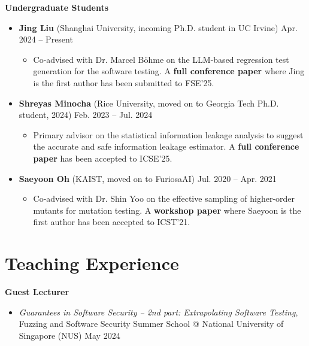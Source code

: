 \documentclass[letterpaper,11pt]{article}
\begin{document}
\textbf{Undergraduate Students}\vspace{-4pt}
\begin{itemize}
  \item \textbf{Jing Liu} (Shanghai University, incoming Ph.D. student in UC Irvine) \hfill Apr. 2024 -- Present \vspace{-6pt}
  \begin{itemize}[leftmargin=.5cm]
    \item[] Co-advised with Dr. Marcel Böhme on the LLM-based regression test generation for the software testing. A \textbf{full conference paper} where Jing is the first author has been submitted to FSE'25.
  \end{itemize}
  \item \textbf{Shreyas Minocha} (Rice University, moved on to Georgia Tech Ph.D. student, 2024) \hfill Feb. 2023 -- Jul. 2024 \vspace{-6pt}
  \begin{itemize}[leftmargin=.5cm]
    \item[] Primary advisor on the statistical information leakage analysis to suggest the accurate and safe information leakage estimator. A \textbf{full conference paper} has been accepted to ICSE'25.
  \end{itemize}
  \item \textbf{Saeyoon Oh} (KAIST, moved on to FuriosaAI) \hfill Jul. 2020 -- Apr. 2021 \vspace{-6pt}
  \begin{itemize}[leftmargin=.5cm]
    \item[] Co-advised with Dr. Shin Yoo on the effective sampling of higher-order mutants for mutation testing. A \textbf{workshop paper} where Saeyoon is the first author has been accepted to ICST'21.
  \end{itemize}
\end{itemize}


\section{Teaching Experience}

\textbf{Guest Lecturer}\vspace{-4pt}
\begin{itemize}
  \item \emph{Guarantees in Software Security -- 2nd part: Extrapolating Software Testing}, \\Fuzzing and Software Security Summer School @ National University of Singapore (NUS) \hfill May 2024
\end{itemize}
\end{document}
